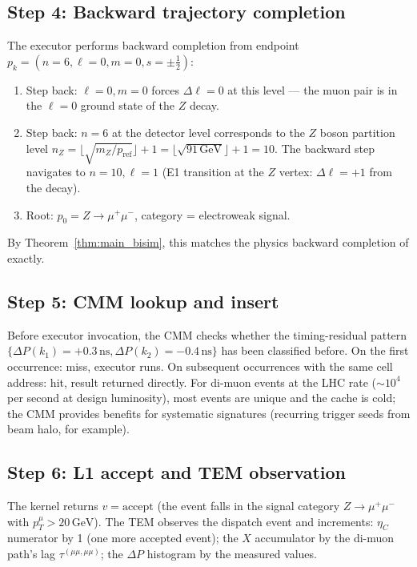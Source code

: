 \documentclass[twocolumn,10pt,a4paper]{article}
\theoremstyle{thmstyle}
\theoremstyle{definition}
\theoremstyle{remark}
\newcommand{\DeltaP}{\Delta P}
\newcommand{\etaC}{\eta_{C}}
\newcommand{\TP}{X}
\newcommand{\lag}{\tau}
\begin{document}
\subsection{Step 4: Backward trajectory completion}

The executor performs backward completion from endpoint
$p_k = (n=6, \ell=0, m=0, s=\pm\tfrac{1}{2})$:
\begin{enumerate}[nosep]
\item Step back: $\ell=0, m=0$ forces $\Delta\ell = 0$ at this level
  — the muon pair is in the $\ell=0$ ground state of the $Z$ decay.
\item Step back: $n = 6$ at the detector level corresponds to the $Z$ boson
  partition level $n_Z = \lfloor\sqrt{m_Z/p_{\mathrm{ref}}}\rfloor + 1
  = \lfloor\sqrt{91\,\mathrm{GeV}}\rfloor + 1 = 10$.
  The backward step navigates to $n=10, \ell=1$ (E1 transition at the $Z$
  vertex: $\Delta\ell = +1$ from the decay).
\item Root: $p_0 = Z \to \mu^+\mu^-$, category = electroweak signal.
\end{enumerate}
By Theorem~\ref{thm:main_bisim}, this matches the physics backward completion
of \citet{companion:trajectory} exactly.

\subsection{Step 5: CMM lookup and insert}

Before executor invocation, the CMM checks whether the timing-residual
pattern $\{\DeltaP(k_1) = +0.3\,\mathrm{ns}, \DeltaP(k_2) = -0.4\,\mathrm{ns}\}$
has been classified before. On the first occurrence: miss, executor runs.
On subsequent occurrences with the same cell address: hit, result returned
directly. For di-muon events at the LHC rate ($\sim 10^4$ per second at design
luminosity), most events are unique and the cache is cold; the CMM provides
benefits for systematic signatures (recurring trigger seeds from beam halo,
for example).

\subsection{Step 6: L1 accept and TEM observation}

The kernel returns $v = \mathrm{accept}$ (the event falls in the signal category
$Z \to \mu^+\mu^-$ with $p_T^{\mu} > 20\,\mathrm{GeV}$). The TEM observes
the dispatch event and increments:
$\etaC$ numerator by 1 (one more accepted event);
the $\TP$ accumulator by the di-muon path's lag $\lag^{(\mu\mu,\mu\mu)}$;
the $\DeltaP$ histogram by the measured values.
\end{document}
